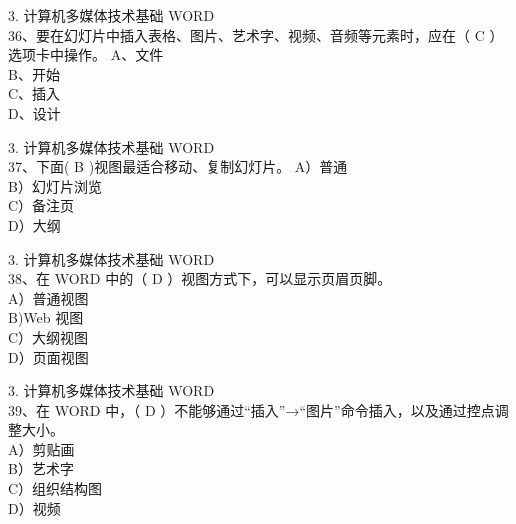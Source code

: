 \documentclass[aspectratio=169]{beamer}
\begin{document}
\begin{frame}[t]{3. 计算机多媒体技术基础} \vspace{20pt}
    WORD\\
36、要在幻灯片中插入表格、图片、艺术字、视频、音频等元素时，应在（ C ）选项卡中操作。
A、文件\\ B、开始\\ C、插入\\ D、设计\\
\end{frame}

\begin{frame}[t]{3. 计算机多媒体技术基础} \vspace{20pt}
    WORD\\

37、下面( B )视图最适合移动、复制幻灯片。
A）普通\\ B）幻灯片浏览\\ C）备注页\\ D）大纲\\
\end{frame}


\begin{frame}[t]{3. 计算机多媒体技术基础} \vspace{20pt}
    WORD\\

38、在 WORD 中的（ D ）视图方式下，可以显示页眉页脚。\\
A）普通视图\\ B)Web 视图\\ C）大纲视图\\ D）页面视图\\
\end{frame}

\begin{frame}[t]{3. 计算机多媒体技术基础} \vspace{20pt}
    WORD\\

39、在 WORD 中，（ D ）不能够通过“插入”→“图片”命令插入，以及通过控点调整大小。\\
A）剪贴画\\ B）艺术字\\ C）组织结构图\\ D）视频\\
\end{frame}
\end{document}
